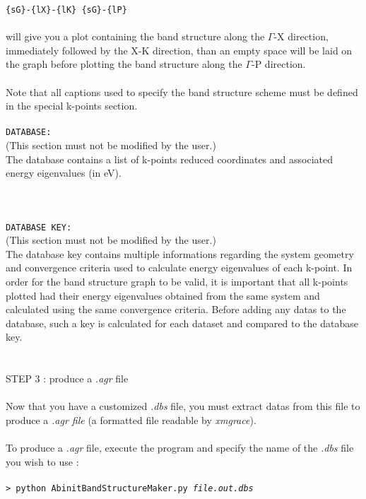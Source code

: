 \documentclass[prl]{article}
\begin{document}
\texttt{\{sG\}-\{lX\}-\{lK\} \{sG\}-\{lP\}} \\
\\
will give you a plot containing the band structure along the $\Gamma$-X direction, immediately followed by the X-K direction, than an empty space will be laid on the graph before plotting the band structure along the $\Gamma$-P direction. \\
\\
Note that all captions used to specify the band structure scheme must be defined in the special k-points section.\\
\\
\texttt{DATABASE:} \\
(This section must not be modified by the user.)\\
The database contains a list of k-points reduced coordinates and associated energy eigenvalues (in eV). \\
\\
\\
\\
\texttt{DATABASE KEY:} \\
(This section must not be modified by the user.) \\
The database key contains multiple informations regarding the system geometry and convergence criteria used to calculate energy eigenvalues of each k-point. In order for the band structure graph to be valid, it is important that all k-points plotted had their energy eigenvalues obtained from the same system and calculated using the same convergence criteria. Before adding any datas to the database, such a key is calculated for each dataset and compared to the database key. \\
\\
\\
{\large{STEP 3 : produce a \textit{.agr} file}} \\
\\
Now that you have a customized \textit{.dbs} file, you must extract datas from this file to produce a \textit{.agr file} (a formatted file readable by \textit{xmgrace}). \\
\\
To produce a \textit{.agr} file, execute the program and specify the name of the \textit{.dbs} file you wish to use : \\
\\
\texttt{> python AbinitBandStructureMaker.py \textit{file.out.dbs}} \\
\end{document}

